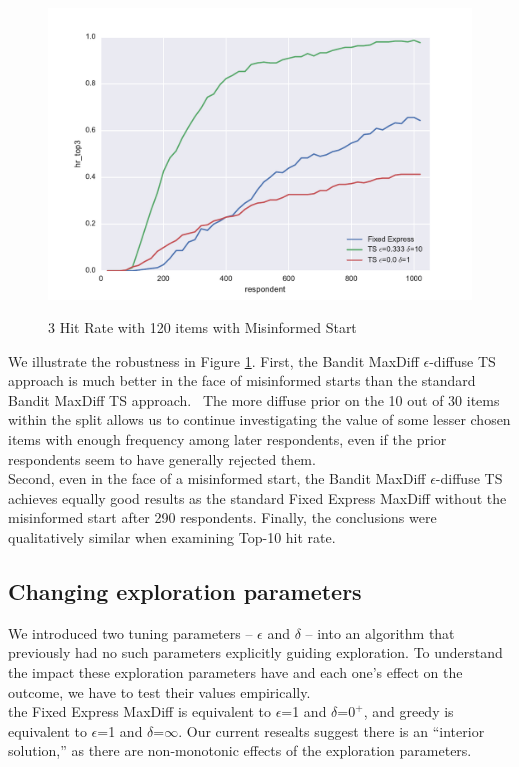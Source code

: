 \documentclass[nonblindrev]{informs3}
\begin{document}
\begin{figure}
\caption{3 Hit Rate with 120 items with Misinformed Start}
\includegraphics[width=1\textwidth]{plots/3hitrate120show3mis.pdf}
\label{fig:3hitmis}
\end{figure}
We illustrate the robustness in Figure \ref{fig:3hitmis}. First, the Bandit MaxDiff $\epsilon$-diffuse TS approach is much better in the face of misinformed starts than the standard Bandit MaxDiff TS approach.  The more diffuse prior on the 10 out of 30 items within the split allows us to continue investigating the value of some lesser chosen items with enough frequency among later respondents, even if the prior respondents seem to have generally rejected them.\\
Second, even in the face of a misinformed start, the Bandit MaxDiff $\epsilon$-diffuse TS achieves equally good results as the standard Fixed Express MaxDiff without the misinformed start after 290 respondents. Finally, the conclusions were qualitatively similar when examining Top-10 hit rate.\\
\subsection{Changing exploration parameters}
We introduced two tuning parameters -- $\epsilon$ and $\delta$ -- into an algorithm that previously had no such parameters explicitly guiding exploration. To understand the impact these exploration parameters have and each one's effect on the outcome, we have to test their values empirically. \\
the Fixed Express MaxDiff is equivalent to $\epsilon$=1 and $\delta$=$0^+$, and greedy is equivalent to $\epsilon$=1 and $\delta$=$\infty$.  Our current resealts suggest there is an ``interior solution,'' as there are non-monotonic effects of the exploration parameters.
\end{document}
